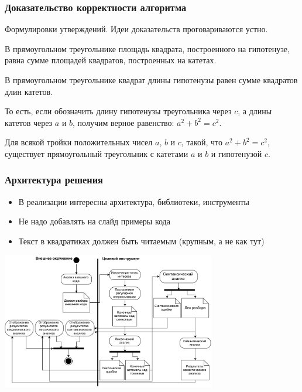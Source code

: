 \documentclass
  [ russian
  , aspectratio=1610 %
  ] {beamer}
\begin{document}
\begin{frame}
    \frametitle{Доказательство корректности алгоритма}
    {\small Формулировки утверждений. Идеи доказательств проговариваются устно.}
    \begin{rutheorem}
        В прямоугольном треугольнике площадь квадрата, построенного на гипотенузе, равна сумме площадей квадратов, построенных на катетах.
    \end{rutheorem}

    \begin{rutheorem}
        В прямоугольном треугольнике квадрат длины гипотенузы равен сумме квадратов длин катетов.

        То есть, если обозначить длину гипотенузы треугольника через $c$, а длины катетов
        через $a$ и $b$, получим верное равенство: $a^2 + b^2 = c^2$.
    \end{rutheorem}

    \begin{rutheorem}
        Для всякой тройки положительных чисел $a$, $b$ и $c$, такой, что $a^2 + b^2 = c^2$, существует прямоугольный треугольник с катетами $a$ и $b$ и гипотенузой $c$.
    \end{rutheorem}
\end{frame}

\begin{frame}
    \frametitle{Архитектура решения}
    \begin{itemize}
        \item В реализации интересны архитектура, библиотеки, инструменты
        \item Не надо добавлять на слайд примеры кода
        \item Текст в квадратиках должен быть читаемым (крупным, а не как тут)
    \end{itemize}
    \begin{center}
        \includegraphics[width=0.7\textwidth]{figures/Activ_SEL_Processing.pdf}
    \end{center}
\end{frame}
\end{document}
